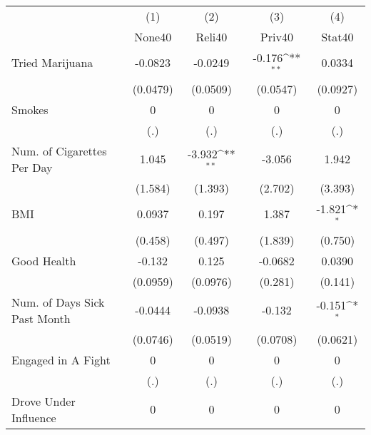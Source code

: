 {
\def\sym#1{\ifmmode^{#1}\else\(^{#1}\)\fi}
\begin{tabular}{l*{4}{c}}
\hline\hline
            &\multicolumn{1}{c}{(1)}&\multicolumn{1}{c}{(2)}&\multicolumn{1}{c}{(3)}&\multicolumn{1}{c}{(4)}\\
            &\multicolumn{1}{c}{None40}&\multicolumn{1}{c}{Reli40}&\multicolumn{1}{c}{Priv40}&\multicolumn{1}{c}{Stat40}\\
\hline
Tried Marijuana&     -0.0823         &     -0.0249         &      -0.176\sym{**} &      0.0334         \\
            &    (0.0479)         &    (0.0509)         &    (0.0547)         &    (0.0927)         \\
[1em]
Smokes      &           0         &           0         &           0         &           0         \\
            &         (.)         &         (.)         &         (.)         &         (.)         \\
[1em]
Num. of Cigarettes Per Day&       1.045         &      -3.932\sym{**} &      -3.056         &       1.942         \\
            &     (1.584)         &     (1.393)         &     (2.702)         &     (3.393)         \\
[1em]
BMI         &      0.0937         &       0.197         &       1.387         &      -1.821\sym{*}  \\
            &     (0.458)         &     (0.497)         &     (1.839)         &     (0.750)         \\
[1em]
Good Health &      -0.132         &       0.125         &     -0.0682         &      0.0390         \\
            &    (0.0959)         &    (0.0976)         &     (0.281)         &     (0.141)         \\
[1em]
Num. of Days Sick Past Month&     -0.0444         &     -0.0938         &      -0.132         &      -0.151\sym{*}  \\
            &    (0.0746)         &    (0.0519)         &    (0.0708)         &    (0.0621)         \\
[1em]
Engaged in A Fight&           0         &           0         &           0         &           0         \\
            &         (.)         &         (.)         &         (.)         &         (.)         \\
[1em]
Drove Under Influence&           0         &           0         &           0         &           0         \\

\end{tabular}}

